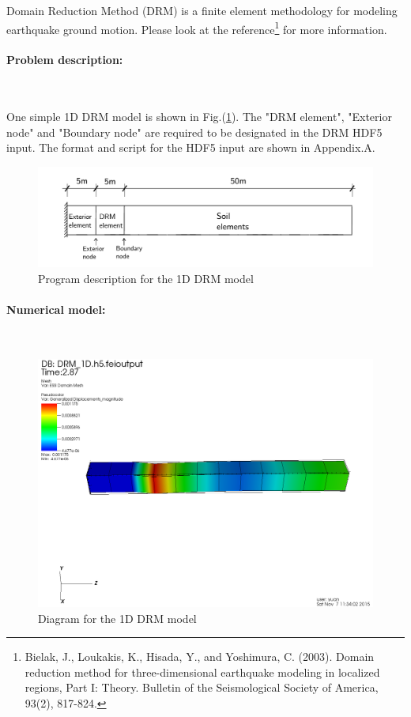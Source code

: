 \documentclass[fleqn,11pt]{article}
\begin{document}
Domain Reduction Method (DRM) is a finite element methodology for modeling earthquake ground motion. Please look at the reference\footnote{Bielak, J., Loukakis, K., Hisada, Y., and Yoshimura, C. (2003). Domain reduction method for three-dimensional earthquake modeling in localized regions, Part I: Theory. Bulletin of the Seismological Society of America, 93(2), 817-824.} for more information. 


\paragraph{Problem description:} ~


One simple 1D DRM model is shown in Fig.(\ref{fig Program description for the 1D DRM model}). The "DRM element", "Exterior node" and "Boundary node" are required to be designated in the DRM HDF5 input. The format and script for the HDF5 input are shown in Appendix.A. 

\begin{figure}[H]
  \centering
  \includegraphics[width=18cm]{../Figure-files/DRM_1D_descrp.pdf}
  \caption{Program description for the 1D DRM model}
  \label{fig Program description for the 1D DRM model}
\end{figure}




\paragraph{Numerical model:} ~


\begin{figure}[H]
  \centering
  \includegraphics[width=15cm]{../Figure-files/DRM_1D_result41.png}
  \caption{Diagram for the 1D DRM model}
  \label{fig Diagram for the 1D DRM model}
\end{figure}
\end{document}
